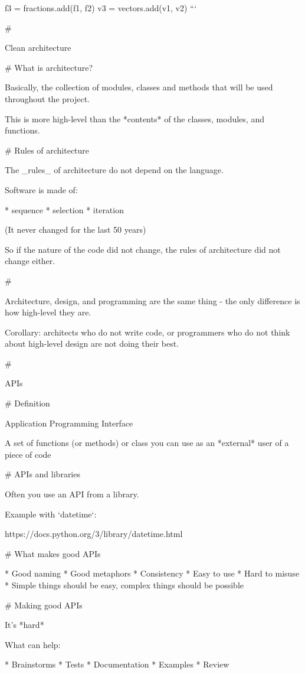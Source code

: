 f3 = fractions.add(f1, f2)
v3 = vectors.add(v1, v2)
```

#

\huge \center Clean architecture

# What is architecture?

Basically, the collection of modules, classes and methods that will
be used throughout the project.

This is more high-level than the *contents* of the classes, modules, and functions.


# Rules of architecture

The _rules_ of architecture do not depend on the language.

Software is made of:

* sequence
* selection
* iteration

(It never changed for the last 50 years)

So if the nature of the code did not change, the rules of architecture did
not change either.

#

Architecture, design, and programming are the same thing - the only difference
is how high-level they are.

Corollary: architects who do not write code, or programmers who do not think about
high-level design are not doing their best.

#

\huge \center APIs


# Definition

Application Programming Interface

A set of functions (or methods) or class you can use
as an *external* user of a piece of code

# APIs and libraries

Often you use an API from a library.

Example with `datetime`:

https://docs.python.org/3/library/datetime.html

# What makes good APIs

* Good naming
* Good metaphors
* Consistency
* Easy to use
* Hard to misuse
* Simple things should be easy, complex things should be possible

# Making good APIs

It's *hard*

What can help:

* Brainstorms
* Tests
* Documentation
* Examples
* Review

